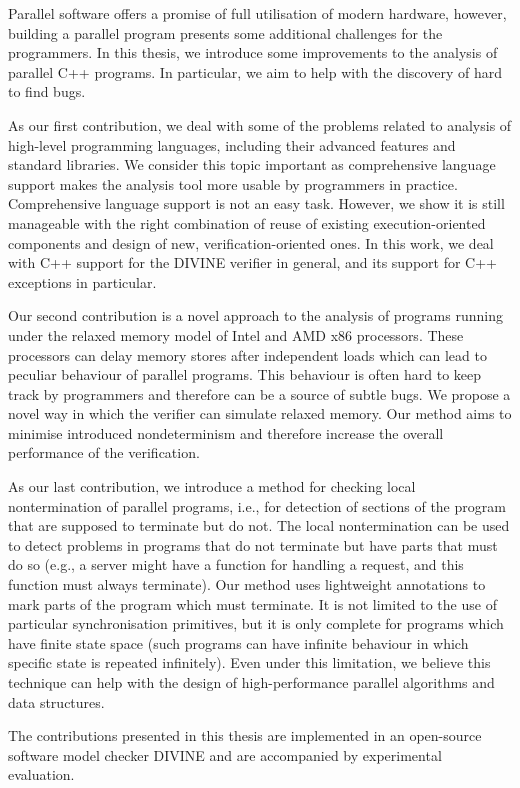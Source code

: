 Parallel software offers a promise of full utilisation of modern hardware,
however, building a parallel program presents some additional challenges for
the programmers.
In this thesis, we introduce some improvements to the analysis of parallel
C++ programs.
In particular, we aim to help with the discovery of hard to find bugs.

As our first contribution, we deal with some of the problems related to
analysis of high-level programming languages, including their advanced features
and standard libraries.
We consider this topic important as comprehensive language support makes the
analysis tool more usable by programmers in practice.
Comprehensive language support is not an easy task.
However, we show it is still manageable with the right combination of reuse of
existing execution-oriented components and design of new, verification-oriented
ones.
In this work, we deal with C++ support for the DIVINE verifier in general, and
its support for C++ exceptions in particular.

Our second contribution is a novel approach to the analysis of programs running
under the relaxed memory model of Intel and AMD x86 processors.
These processors can delay memory stores after independent loads which can lead
to peculiar behaviour of parallel programs.
This behaviour is often hard to keep track by programmers and therefore can be
a source of subtle bugs.
We propose a novel way in which the verifier can simulate relaxed memory.
Our method aims to minimise introduced nondeterminism and therefore increase
the overall performance of the verification.

As our last contribution, we introduce a method for checking local
nontermination of parallel programs, i.e., for detection of sections of the
program that are supposed to terminate but do not.
The local nontermination can be used to detect problems in programs that do not
terminate but have parts that must do so (e.g., a server might have a
function for handling a request, and this function must always terminate).
Our method uses lightweight annotations to mark parts of the program which must
terminate.
It is not limited to the use of particular synchronisation primitives, but it
is only complete for programs which have finite state space (such programs can
have infinite behaviour in which specific state is repeated infinitely).
Even under this limitation, we believe this technique can help with the design
of high-performance parallel algorithms and data structures.

The contributions presented in this thesis are implemented in an open-source
software model checker DIVINE and are accompanied by experimental evaluation.

